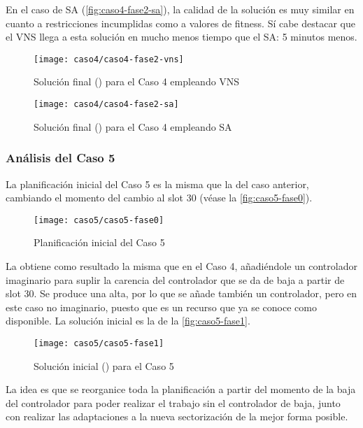 En el caso de SA (\autoref{fig:caso4-fase2-sa}), la calidad de la solución es muy similar en cuanto a restricciones incumplidas como a valores de fitness. Sí cabe destacar que el VNS llega a esta solución en mucho menos tiempo que el SA: 5 minutos menos.

\begin{figure}[!]
	\centering
	\texttt{[image: caso4/caso4-fase2-vns]}
	\caption{Solución final (\fasedos{}) para el Caso 4 empleando VNS}
	\label{fig:caso4-fase2-vns}
\end{figure}

\begin{figure}[!]
	\centering
	\texttt{[image: caso4/caso4-fase2-sa]}
	\caption{Solución final (\fasedos{}) para el Caso 4 empleando SA}
	\label{fig:caso4-fase2-sa}
\end{figure}

\subsubsection{Análisis del Caso 5}

La planificación inicial del Caso 5 es la misma que la del caso anterior, cambiando el momento del cambio al slot 30 (véase la \autoref{fig:caso5-fase0}).

\begin{figure}[!]
	\centering
	\texttt{[image: caso5/caso5-fase0]}
	\caption{Planificación inicial del Caso 5}
	\label{fig:caso5-fase0}
\end{figure}

La \faseuno{} obtiene como resultado la misma que en el Caso 4, añadiéndole un controlador imaginario para suplir la carencia del controlador que se da de baja a partir de slot 30. Se produce una alta, por lo que se añade también un controlador, pero en este caso no imaginario, puesto que es un recurso que ya se conoce como disponible. La solución inicial es la de la \autoref{fig:caso5-fase1}.

\begin{figure}[!]
	\centering
	\texttt{[image: caso5/caso5-fase1]}
	\caption{Solución inicial (\faseuno{}) para el Caso 5}
	\label{fig:caso5-fase1}
\end{figure}

La idea es que se reorganice toda la planificación a partir del momento de la baja del controlador para poder realizar el trabajo sin el controlador de baja, junto con realizar las adaptaciones a la nueva sectorización de la mejor forma posible.

